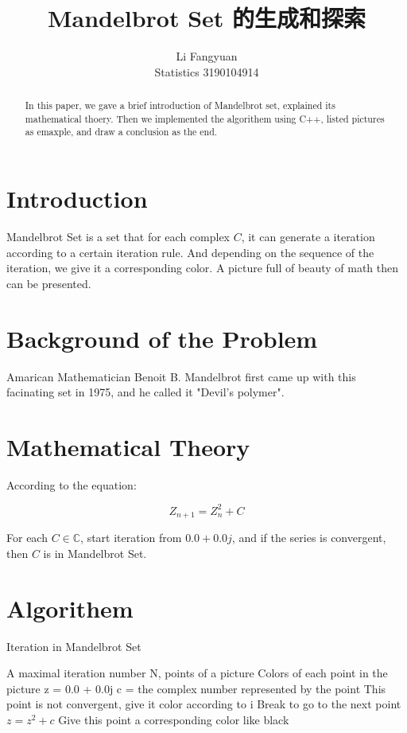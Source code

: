\documentclass{ctexart}
\title{Mandelbrot Set 的生成和探索}
\author{Li Fangyuan \\ Statistics   3190104914}
\begin{document}
\maketitle

\begin{abstract}
  In this paper, we gave a brief introduction of Mandelbrot set, explained its mathematical thoery. Then we implemented the algorithem using C++, listed pictures as emaxple, and draw a conclusion as the end.
\end{abstract}

\section{Introduction}
Mandelbrot Set is a set that for each complex $ C $, it can generate a iteration according to a certain iteration rule. 
And depending on the sequence of the iteration, we give it a corresponding color. 
A picture full of beauty of math then can be presented.

\section{Background of the Problem}
Amarican Mathematician Benoit B. Mandelbrot first came up with this facinating set in 1975, and he called it "Devil's polymer". \cite{H42}

\section{Mathematical Theory}
According to the equation:

\begin{equation}
  Z_{n+1} = Z_{n}^{2} + C  
\end{equation}

For each $ C \in \mathbb{C} $, start iteration from $ 0.0 + 0.0j $, and if the series is convergent, then $ C $ is in Mandelbrot Set. \cite{H43}

\section{Algorithem}

\begin{algorithm}[h]  
  \caption{Iteration in Mandelbrot Set}  
  \label{alg:Framwork}  
  \begin{algorithmic}  
    \Require  
        A maximal iteration number N, points of a picture
     \Ensure 
        Colors of each point in the picture
          \State z = 0.0 + 0.0j
          \State c = the complex number represented by the point \cite{H44}
                  \State This point is not convergent, give it color according to i
                  \State Break to go to the next point
              \Else   \State $z = z^{2} + c$
              \EndIf
              \State Give this point a corresponding color like black
              \EndIf
          \EndFor  
      \EndFor
  \end{algorithmic}  
\end{algorithm}
\end{document}

